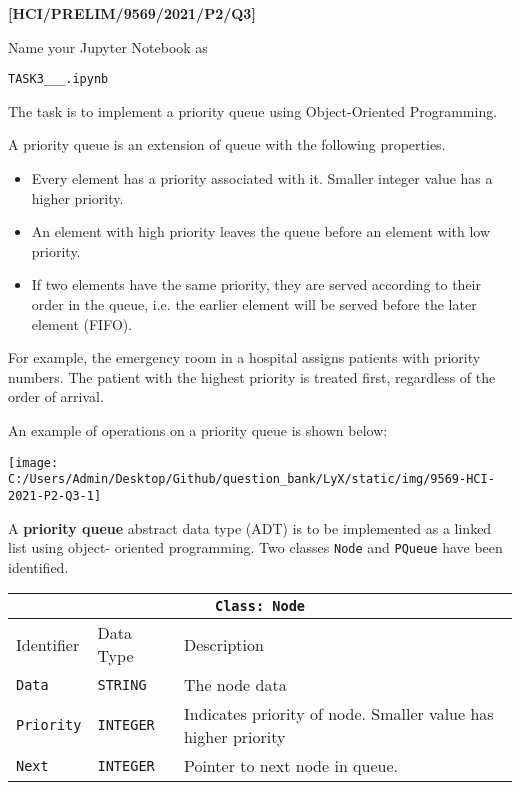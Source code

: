 \item \textbf{{[}HCI/PRELIM/9569/2021/P2/Q3{]}}

Name your Jupyter Notebook as 

\texttt{TASK3\_<your name>\_<centre number>\_<index number>.ipynb }

The task is to implement a priority queue using Object-Oriented Programming. 

A priority queue is an extension of queue with the following properties. 
\begin{itemize}
\item Every element has a priority associated with it. Smaller integer value
has a higher priority. 
\item An element with high priority leaves the queue before an element with
low priority.
\item If two elements have the same priority, they are served according
to their order in the queue, i.e. the earlier element will be served
before the later element (FIFO). 
\end{itemize}
For example, the emergency room in a hospital assigns patients with
priority numbers. The patient with the highest priority is treated
first, regardless of the order of arrival. 

An example of operations on a priority queue is shown below: 
\begin{center}
\texttt{[image: C:/Users/Admin/Desktop/Github/question\_bank/LyX/static/img/9569-HCI-2021-P2-Q3-1]}
\par\end{center}

A \textbf{priority queue} abstract data type (ADT) is to be implemented
as a linked list using object- oriented programming. Two classes \texttt{Node}
and \texttt{PQueue} have been identified.
\begin{center}
\begin{tabular}{|l|l|l|}
\hline 
\multicolumn{3}{|c|}{\texttt{Class: Node}}\tabularnewline
\hline 
\texttt{\hspace{0.01\columnwidth}}Identifier & \texttt{\hspace{0.01\columnwidth}}Data Type & \texttt{\hspace{0.05\columnwidth}}Description\tabularnewline
\hline 
\texttt{Data} & \texttt{STRING} & The node data\tabularnewline
\hline 
\texttt{Priority} & \texttt{INTEGER} & Indicates priority of node. Smaller value has higher priority\tabularnewline
\hline 
\texttt{Next} & \texttt{INTEGER} & Pointer to next node in queue.\tabularnewline
\hline 
\end{tabular}
\par\end{center}

